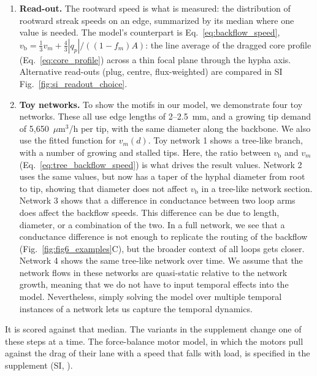 \begin{enumerate}
Flow passes between hyphae at junctions at no cost: one global pressure solve over the whole network; a resistance for switching hyphae at junctions, and the conveyor limit in which every edge carries back its own motor stream, are SI variants ().
  \item \textbf{Read-out.}
The rootward speed is what is measured: the distribution of rootward streak speeds on an edge, summarized by its median where one value is needed.
The model's counterpart is Eq.~\eqref{eq:backflow_speed}, $v_\mathrm{b} = \tfrac{1}{3} v_m + \tfrac{4}{3}|q_p| / ((1-f_m) A)$: the line average of the dragged core profile (Eq.~\eqref{eq:core_profile}) across a thin focal plane through the hypha axis. Alternative read-outs (plug, centre, flux-weighted) are compared in SI Fig.~\ref{fig:si_readout_choice}.
  \item \textbf{Toy networks.}
To show the motifs in our model, we demonstrate four toy networks. These all use edge lengths of 2--2.5~mm, and a growing tip demand of 5,650~$\mu$m$^3$/h per tip, with the same diameter along the backbone. We also use the fitted function for $v_m(d)$. Toy network 1 shows a tree-like branch, with a number of growing and stalled tips. Here, the ratio between $v_\mathrm{b}$ and $v_m$ (Eq.~\eqref{eq:tree_backflow_speed}) is what drives the result values. Network 2 uses the same values, but now has a taper of the hyphal diameter from root to tip, showing that diameter does not affect $v_\mathrm{b}$ in a tree-like network section. Network 3 shows that a difference in conductance between two loop arms does affect the backflow speeds. This difference can be due to length, diameter, or a combination of the two. In a full network, we see that a conductance difference is not enough to replicate the routing of the backflow (Fig.~\ref{fig:fig6_examples}C), but the broader context of all loops gets closer. Network 4 shows the same tree-like network over time. We assume that the network flows in these networks are quasi-static relative to the network growth, meaning that we do not have to input temporal effects into the model. Nevertheless, simply solving the model over multiple temporal instances of a network lets us capture the temporal dynamics.
\end{enumerate}
It is scored against that median.
The variants in the supplement change one of these steps at a time.
The force-balance motor model, in which the motors pull against the drag of their lane with a speed that falls with load, is specified in the supplement (SI, ).

